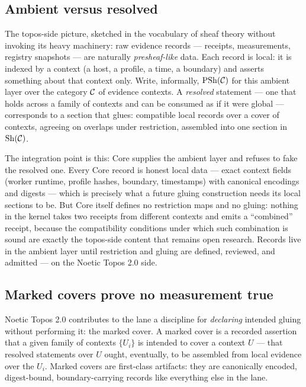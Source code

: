 \subsection{Ambient versus resolved}\label{integ:topos:ambient}

The topos-side picture, sketched in the vocabulary of sheaf theory without invoking its heavy machinery: raw evidence records --- receipts, measurements, registry snapshots --- are naturally \emph{presheaf-like} data. Each record is local: it is indexed by a context (a host, a profile, a time, a boundary) and asserts something about that context only. Write, informally, $\mathrm{PSh}(\mathcal{C})$ for this ambient layer over the category $\mathcal{C}$ of evidence contexts. A \emph{resolved} statement --- one that holds across a family of contexts and can be consumed as if it were global --- corresponds to a section that glues: compatible local records over a cover of contexts, agreeing on overlaps under restriction, assembled into one section in $\mathrm{Sh}(\mathcal{C})$.

The integration point is this: Core supplies the ambient layer and refuses to fake the resolved one. Every Core record is honest local data --- exact context fields (worker runtime, profile hashes, boundary, timestamps) with canonical encodings and digests --- which is precisely what a future gluing construction needs its local sections to be. But Core itself defines no restriction maps and no gluing: nothing in the kernel takes two receipts from different contexts and emits a ``combined'' receipt, because the compatibility conditions under which such combination is sound are exactly the topos-side content that remains open research. Records live in the ambient layer until restriction and gluing are defined, reviewed, and admitted --- on the Noetic Topos 2.0 side.

\subsection{Marked covers prove no measurement true}\label{integ:topos:covers}

Noetic Topos 2.0 contributes to the lane a discipline for \emph{declaring} intended gluing without performing it: the marked cover. A marked cover is a recorded assertion that a given family of contexts $\{U_i\}$ is intended to cover a context $U$ --- that resolved statements over $U$ ought, eventually, to be assembled from local evidence over the $U_i$. Marked covers are first-class artifacts: they are canonically encoded, digest-bound, boundary-carrying records like everything else in the lane.

